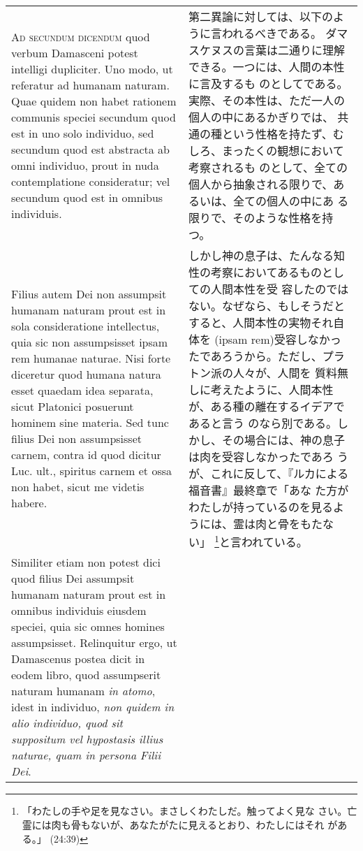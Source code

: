 \documentclass[10pt]{jsarticle} %
\begin{document}
\begin{longtable}{p{21em}p{21em}}
\\



{\scshape Ad secundum dicendum} quod verbum Damasceni potest intelligi
dupliciter. Uno modo, ut referatur ad humanam naturam. Quae quidem non
habet rationem communis speciei secundum quod est in uno solo individuo,
sed secundum quod est abstracta ab omni individuo, prout in nuda
contemplatione consideratur; vel secundum quod est in omnibus
individuis. 


&

第二異論に対しては、以下のように言われるべきである。
ダマスケヌスの言葉は二通りに理解できる。一つには、人間の本性に言及するも
 のとしてである。実際、その本性は、ただ一人の個人の中にあるかぎりでは、
 共通の種という性格を持たず、むしろ、まったくの観想において考察されるも
 のとして、全ての個人から抽象される限りで、あるいは、全ての個人の中にあ
 る限りで、そのような性格を持つ。


\\


Filius autem Dei non assumpsit humanam naturam prout est in
sola consideratione intellectus, quia sic non assumpsisset ipsam rem
humanae naturae. Nisi forte diceretur quod humana natura esset quaedam
idea separata, sicut Platonici posuerunt hominem sine materia. Sed tunc
filius Dei non assumpsisset carnem, contra id quod dicitur Luc. ult.,
spiritus carnem et ossa non habet, sicut me videtis habere. 



&


しかし神の息子は、たんなる知性の考察においてあるものとしての人間本性を受
 容したのではない。なぜなら、もしそうだとすると、人間本性の実物それ自体を
 (ipsam rem)受容しなかったであろうから。ただし、プラトン派の人々が、人間を
 質料無しに考えたように、人間本性が、ある種の離在するイデアであると言う
 のなら別である。しかし、その場合には、神の息子は肉を受容しなかったであろ
 うが、これに反して、『ルカによる福音書』最終章で「あな
 た方がわたしが持っているのを見るようには、霊は肉と骨をもたない」
 \footnote{「わたしの手や足を見なさい。まさしくわたしだ。触ってよく見な
 さい。亡霊には肉も骨もないが、あなたがたに見えるとおり、わたしにはそれ
 がある。」 (24:39)}と言われている。

\\


Similiter
etiam non potest dici quod filius Dei assumpsit humanam naturam prout
est in omnibus individuis eiusdem speciei, quia sic omnes homines
assumpsisset. Relinquitur ergo, ut Damascenus postea dicit in eodem
libro, quod assumpserit naturam humanam {\itshape in atomo}, idest in individuo,
{\itshape non quidem in alio individuo, quod sit suppositum vel hypostasis illius
naturae, quam in persona Filii Dei}. 




\end{longtable}
\end{document}
